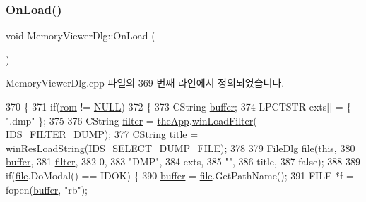 \subsubsection{\texorpdfstring{On\+Load()}{OnLoad()}}
{\footnotesize\ttfamily void Memory\+Viewer\+Dlg\+::\+On\+Load (\begin{DoxyParamCaption}{ }\end{DoxyParamCaption})\hspace{0.3cm}{\ttfamily [protected]}}



Memory\+Viewer\+Dlg.\+cpp 파일의 369 번째 라인에서 정의되었습니다.


\begin{DoxyCode}
370 \{
371   \textcolor{keywordflow}{if}(\mbox{\hyperlink{_globals_8cpp_adafc6ed627110c42f3893c9783f55320}{rom}} != \mbox{\hyperlink{getopt1_8c_a070d2ce7b6bb7e5c05602aa8c308d0c4}{NULL}})
372   \{
373     CString \mbox{\hyperlink{_g_b_a_8cpp_a28d4d3d8445e73a696b2d6f7eadabd96}{buffer}};
374     LPCTSTR exts[] = \{ \textcolor{stringliteral}{".dmp"} \};
375 
376     CString \mbox{\hyperlink{_s_d_l_8cpp_af0122ee4312107103b580a98c74a4ea6}{filter}} = \mbox{\hyperlink{_v_b_a_8cpp_a8095a9d06b37a7efe3723f3218ad8fb3}{theApp}}.\mbox{\hyperlink{class_v_b_a_a228edf26b0dc4129658c174ee5a3c27c}{winLoadFilter}}(
      \mbox{\hyperlink{resource_8h_aaf1a4e4f021c1d724b128a7e1434e3b0}{IDS\_FILTER\_DUMP}});
377     CString title = \mbox{\hyperlink{_win_res_util_8cpp_a416e85e80ab9b01376e87251c83d1a5a}{winResLoadString}}(\mbox{\hyperlink{resource_8h_a3f960ace1d09f5827e8739b1e7ea2002}{IDS\_SELECT\_DUMP\_FILE}});
378 
379     \mbox{\hyperlink{class_file_dlg}{FileDlg}} \mbox{\hyperlink{expr-lex_8cpp_a702945180aa732857b380a007a7e2a21}{file}}(\textcolor{keyword}{this},
380                  \mbox{\hyperlink{_g_b_a_8cpp_a28d4d3d8445e73a696b2d6f7eadabd96}{buffer}},
381                  \mbox{\hyperlink{_s_d_l_8cpp_af0122ee4312107103b580a98c74a4ea6}{filter}},
382                  0,
383                  \textcolor{stringliteral}{"DMP"},
384                  exts,
385                  \textcolor{stringliteral}{""},
386                  title,
387                  \textcolor{keyword}{false});
388   
389     \textcolor{keywordflow}{if}(\mbox{\hyperlink{expr-lex_8cpp_a702945180aa732857b380a007a7e2a21}{file}}.DoModal() == IDOK) \{
390       \mbox{\hyperlink{_g_b_a_8cpp_a28d4d3d8445e73a696b2d6f7eadabd96}{buffer}} = \mbox{\hyperlink{expr-lex_8cpp_a702945180aa732857b380a007a7e2a21}{file}}.GetPathName();
391       FILE *f = fopen(\mbox{\hyperlink{_g_b_a_8cpp_a28d4d3d8445e73a696b2d6f7eadabd96}{buffer}}, \textcolor{stringliteral}{"rb"});

\end{DoxyCode}
